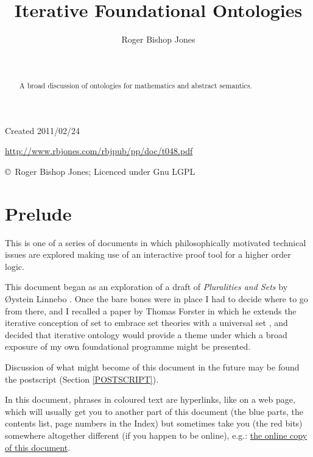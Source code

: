 \documentclass[11pt]{article}
\title{Iterative Foundational Ontologies}
\author{Roger Bishop Jones}
\date{\ }
\begin{document}
\begin{titlepage}
\maketitle
\begin{abstract}
A broad discussion of ontologies for mathematics and abstract semantics.
\end{abstract}
\vfill

\begin{centering}
{\footnotesize

Created 2011/02/24



\href{http://www.rbjones.com/rbjpub/pp/doc/t048.pdf}
{http://www.rbjones.com/rbjpub/pp/doc/t048.pdf}

\copyright\ Roger Bishop Jones; Licenced under Gnu LGPL

}%
\end{centering}

\thispagestyle{empty}
\end{titlepage}

\newpage
\addtocounter{page}{1}
{\parskip=0pt\tableofcontents}

\section{Prelude}

This is one of a series of documents in which philosophically motivated technical issues are explored making use of an interactive proof tool for a higher order logic.


This document began as an exploration of a draft of \emph{Pluralities and Sets} by {\O}ystein Linnebo \cite{linneboPS}.
Once the bare bones were in place I had to decide where to go from there, and I recalled a paper by Thomas Forster in which he extends the iterative conception of set to embrace set theories with a universal set \cite{forsterTICS}, and decided that iterative ontology would provide a theme under which a broad exposure of my own foundational programme might be presented.

Discussion of what might become of this document in the future may be found the postscript (Section \ref{POSTSCRIPT}).

In this document, phrases in coloured text are hyperlinks, like on a web page, which will usually get you to another part of this document (the blue parts, the contents list, page numbers in the Index) but sometimes take you (the red bits) somewhere altogether different (if you happen to be online), e.g.: \href{http://rbjones.com/rbjpub/pp/doc/t046.pdf}{the online copy of this document}.
\end{document}
